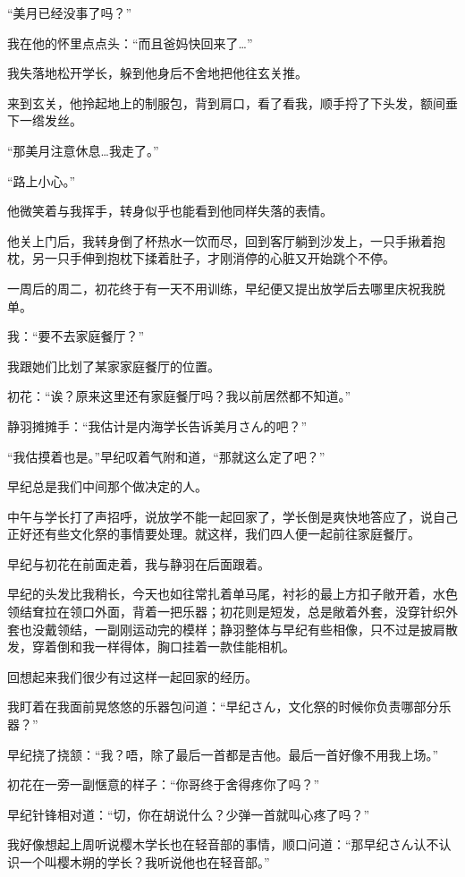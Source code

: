 “美月已经没事了吗？”

我在他的怀里点点头：“而且爸妈快回来了…”

我失落地松开学长，躲到他身后不舍地把他往玄关推。

来到玄关，他拎起地上的制服包，背到肩口，看了看我，顺手捋了下头发，额间垂下一绺发丝。

“那美月注意休息…我走了。”

“路上小心。”

他微笑着与我挥手，转身似乎也能看到他同样失落的表情。

他关上门后，我转身倒了杯热水一饮而尽，回到客厅躺到沙发上，一只手揪着抱枕，另一只手伸到抱枕下揉着肚子，才刚消停的心脏又开始跳个不停。

\cutlinec

\newday{\cloud}

一周后的周二，初花终于有一天不用训练，早纪便又提出放学后去哪里庆祝我脱单。

我：“要不去家庭餐厅？”

我跟她们比划了某家家庭餐厅的位置。

初花：“诶？原来这里还有家庭餐厅吗？我以前居然都不知道。”

静羽摊摊手：“我估计是内海学长告诉美月さん的吧？”

“我估摸着也是。”早纪叹着气附和道，“那就这么定了吧？”

早纪总是我们中间那个做决定的人。

中午与学长打了声招呼，说放学不能一起回家了，学长倒是爽快地答应了，说自己正好还有些文化祭的事情要处理。就这样，我们四人便一起前往家庭餐厅。

早纪与初花在前面走着，我与静羽在后面跟着。

早纪的头发比我稍长，今天也如往常扎着单马尾，衬衫的最上方扣子敞开着，水色领结耷拉在领口外面，背着一把乐器；初花则是短发，总是敞着外套，没穿针织外套也没戴领结，一副刚运动完的模样；静羽整体与早纪有些相像，只不过是披肩散发，穿着倒和我一样得体，胸口挂着一款佳能相机。

回想起来我们很少有过这样一起回家的经历。

我盯着在我面前晃悠悠的乐器包问道：“早纪さん，文化祭的时候你负责哪部分乐器？”

早纪挠了挠颔：“我？唔，除了最后一首都是吉他。最后一首好像不用我上场。”

初花在一旁一副惬意的样子：“你哥终于舍得疼你了吗？”

早纪针锋相对道：“切，你在胡说什么？少弹一首就叫心疼了吗？”

我好像想起上周听说樱木学长也在轻音部的事情，顺口问道：“那早纪さん认不认识一个叫樱木朔的学长？我听说他也在轻音部。”

